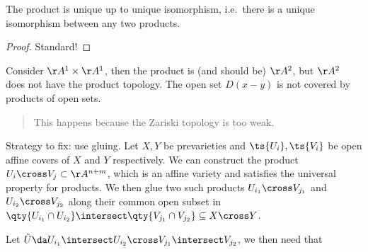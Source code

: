 \begin{center}
\end{center}

\begin{proposition}[?]

The product is unique up to unique isomorphism, i.e.~there is a unique
isomorphism between any two products.

\end{proposition}

\begin{proof}

Standard!

\end{proof}

\begin{example}

Consider \(\AA^1 \times \AA^1\), then the product is (and should be)
\(\AA^2\), but \(\AA^2\) does not have the product topology. The open
set \(D(x-y)\) is not covered by products of open sets.

\begin{quote}
This happens because the Zariski topology is too weak.
\end{quote}

\end{example}

Strategy to fix: use gluing. Let \(X, Y\) be prevarieties and
\(\ts{U_i}, \ts{V_i}\) be open affine covers of \(X\) and \(Y\)
respectively. We can construct the product
\(U_i \cross V_j \subset \AA^{n+m}\), which is an affine variety and
satisfies the universal property for products. We then glue two such
products \(U_{i_1} \cross V_{j_1}\) and \(U_{i_2} \cross V_{j_2}\) along
their common open subset in
\(\qty{U_{i_1}\cap U_{i_2} }\intersect\qty{V_{j_1} \cap V_{j_2}} \subseteq X\cross Y\).

Let
\(\tilde U \da U_{i_1} \intersect U_{i_2} \cross V_{j_1} \intersect V_{j_2}\),
we then need that

